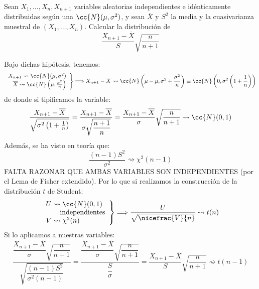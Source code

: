 \begin{ejercicio}
    Sean $X_1, \ldots, X_n, X_{n+1}$ variables aleatorias independientes e idénticamente distribuidas según una $\cc{N}(\mu, \sigma^2)$, y sean $\overline{X}$ y $S^2$ la media y la cuasivarianza muestral de $(X_1, \ldots, X_n)$. Calcular la distribución de
    \begin{equation*}
        \dfrac{X_{n+1}- \overline{X}}{S}\sqrt{\dfrac{n}{n+1}}
    \end{equation*}

    \noindent
    Bajo dichas hipótesis, tenemos:
    \begin{equation*}
        \left.\begin{array}{r}
            X_{n+1} \rightsquigarrow \cc{N}(\mu, \sigma^2) \\
            \overline{X} \rightsquigarrow \cc{N}\left(\mu, \frac{\sigma^2}{n}\right)
    \end{array}\right\}\Longrightarrow X_{n+1}-\overline{X} \rightsquigarrow\cc{N}\left(\mu-\mu, \sigma^2 + \frac{\sigma^2}{n}\right) \equiv \cc{N}\left(0, \sigma^2\left(1+\frac{1}{n}\right)\right)
    \end{equation*}
    de donde si tipificamos la variable:
    \begin{equation*}
        \dfrac{X_{n+1}-\overline{X}}{\sqrt{\sigma^2\left(1+\frac{1}{n}\right)}} = \dfrac{X_{n+1}-\overline{X}}{\sigma\sqrt{\dfrac{n+1}{n}}} = \dfrac{X_{n+1}-\overline{X}}{\sigma}\sqrt{\dfrac{n}{n+1}}\rightsquigarrow \cc{N}(0,1)
    \end{equation*}
    Además, se ha visto en teoría que:
    \begin{equation*}
        \dfrac{(n-1)S^2}{\sigma^2} \rightsquigarrow\chi^2(n-1)
    \end{equation*}
    FALTA RAZONAR QUE AMBAS VARIABLES SON INDEPENDIENTES (por el Lema de Fisher extendido). Por lo que si realizamos la construcción de la distribución $t$ de Student:
    \begin{equation*}
        \left.\begin{array}{l}
                U\rightsquigarrow \cc{N}(0,1) \\
                \qquad \text{independientes} \\
                V\rightsquigarrow\chi^2(n)
        \end{array}\right\} \Longrightarrow \dfrac{U}{\sqrt{\nicefrac{V}{n}}} \rightsquigarrow t(n)
    \end{equation*}
    Si lo aplicamos a nuestras variables:
    \begin{equation*}
        \dfrac{\dfrac{X_{n+1}-\overline{X}}{\sigma}\sqrt{\dfrac{n}{n+1}}}{\sqrt{\dfrac{(n-1)S^2}{\sigma^2(n-1)}}} = \dfrac{\dfrac{X_{n+1}-\overline{X}}{\sigma}\sqrt{\dfrac{n}{n+1}}}{\dfrac{S}{\sigma}} = \dfrac{X_{n+1}- \overline{X}}{S}\sqrt{\dfrac{n}{n+1}} \rightsquigarrow t(n-1)
    \end{equation*}
\end{ejercicio}

